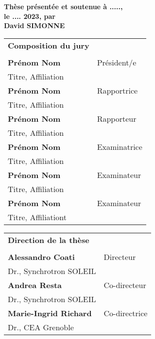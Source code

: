 \begin{titlepage}
\textbf{Thèse présentée et soutenue à .....,\\ le .... 2023, par}\\
\bigskip
\Large {\color{Prune} \textbf{David SIMONNE}}

\vspace{\fill} %

\bigskip
\flushleft
\scriptsize
\begin{tabular}{|p{7cm}l}
\arrayrulecolor{Prune}
{\footnotesize \textbf{Composition du jury}}\\
& \\
\textbf{Prénom Nom} &   Président/e\\ 
Titre, Affiliation & \\
\textbf{Prénom Nom} &  Rapportrice \\ 
Titre, Affiliation   &   \\ 
\textbf{Prénom Nom} &  Rapporteur \\ 
Titre, Affiliation  &   \\ 
\textbf{Prénom Nom} &  Examinatrice \\ 
Titre, Affiliation   &   \\ 
\textbf{Prénom Nom} &  Examinateur \\ 
Titre, Affiliation   &   \\ 
\textbf{Prénom Nom} &  Examinateur \\ 
Titre, Affiliationt   &   \\ 

\end{tabular} 

\medskip
\begin{tabular}{|p{7cm}l}
\arrayrulecolor{Prune}
{\footnotesize \textbf{Direction de la thèse}}\\
& \\
\textbf{Alessandro Coati} & Directeur\\
Dr., Synchrotron SOLEIL & \\
\textbf{Andrea Resta} & Co-directeur\\
Dr., Synchrotron SOLEIL & \\
\textbf{Marie-Ingrid Richard} & Co-directrice\\
Dr., CEA Grenoble & \\

\end{tabular} 

\end{titlepage}